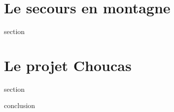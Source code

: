 \section{Le secours en montagne}
\label{sec:1-1}
{section}

\section{Le projet Choucas}
\label{sec:1-2}
{section}

\label{sec:1-cnc}
{conclusion}


